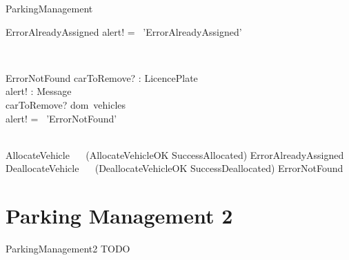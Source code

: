 \documentclass[12pt]{article}
\begin{document}
\begin{spacing}{1.5}
\begin{class}{ParkingManagement}
\begin{op}{ErrorAlreadyAssigned}
alert! = \ 'ErrorAlreadyAssigned'
\end{op}\\
\begin{op}{ErrorNotFound}
carToRemove? : LicencePlate\\
alert! : Message\\
\ST
carToRemove? \notin dom~vehicles\\
alert! = \ 'ErrorNotFound'
\end{op}\\
AllocateVehicle  \ \mathrel{\widehat{=}} \ (AllocateVehicleOK \wedge SuccessAllocated) \vee ErrorAlreadyAssigned \\
DeallocateVehicle  \ \mathrel{\widehat{=}} \ (DeallocateVehicleOK \wedge SuccessDeallocated) \vee ErrorNotFound \\
\end{class}

\newpage

\section{Parking Management 2}

\begin{class}{ParkingManagement2}
TODO
\end{class}





\end{spacing}
\end{document}
